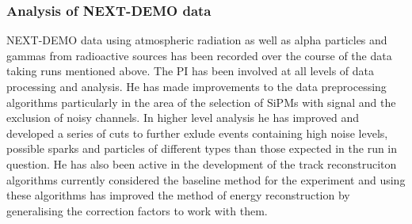 \documentclass[a4paper,11pt,oneside]{article}
\begin{document}
\subsubsection*{Analysis of NEXT-DEMO data}
NEXT-DEMO data using atmospheric radiation as well as alpha particles
and gammas from radioactive sources has been recorded over the course
of the data taking runs mentioned above. The PI has been involved at
all levels of data processing and analysis. He has made improvements
to the data preprocessing algorithms particularly in the area of the
selection of SiPMs with signal and the exclusion of noisy
channels. In higher level analysis he has improved and developed a
series of cuts to further exlude events containing high noise levels,
possible sparks and particles of different types than those expected
in the run in question. He has also been active in the development of
the track reconstruciton algorithms currently considered the baseline
method for the experiment and using these algorithms has improved the
method of energy reconstruction by generalising the correction factors
to work with them. %
\end{document}
